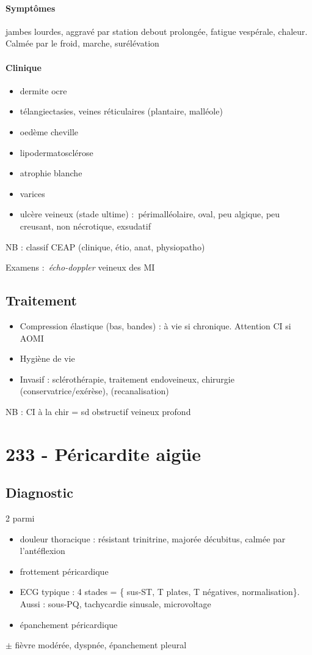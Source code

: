 \paragraph{Symptômes} jambes lourdes, aggravé par station debout prolongée,
fatigue vespérale, chaleur. Calmée par le froid, marche, surélévation

\paragraph{Clinique}
\begin{itemize}
  \item dermite ocre
  \item télangiectasies, veines réticulaires (plantaire, malléole)
  \item oedème cheville
  \item lipodermatosclérose
  \item atrophie blanche
  \item varices
  \item ulcère veineux (stade ultime) : périmalléolaire, oval, peu algique, peu
    creusant, non nécrotique, exsudatif
\end{itemize}
NB : classif CEAP (clinique, étio, anat, physiopatho)

Examens : \textit{écho-doppler} veineux des MI

\subsection{Traitement}
\begin{itemize}
  \item Compression élastique (bas, bandes) : à vie si chronique. Attention CI si AOMI
  \item Hygiène de vie
  \item Invasif : sclérothérapie, traitement endoveineux, chirurgie (conservatrice/exérèse), (recanalisation)
\end{itemize}
NB : CI à la chir = sd obstructif veineux profond

\section{233 - Péricardite aigüe}%
\label{sec:233_pericardite_aigue}

\subsection{Diagnostic}
2 parmi
\begin{itemize}
  \item douleur thoracique : résistant trinitrine, majorée décubitus, calmée par
    l'antéflexion
  \item frottement péricardique
  \item ECG typique : 4 stades = \{ sus-ST, T plates, T négatives,
    normalisation\}. Aussi : sous-PQ, tachycardie sinusale, microvoltage
  \item épanchement péricardique
\end{itemize}
$\pm$ fièvre modérée, dyspnée, épanchement pleural

